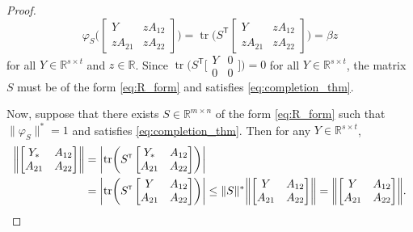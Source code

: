 \documentclass[10pt,a4paper]{amsart}
\DeclareMathOperator{\tr}{tr}
\newcommand{\R}{\mathbb{R}}
\newcommand{\tp}{{\scriptscriptstyle\mathsf{T}}}
\begin{document}
\begin{proof}
\[
\varphi_S\biggl( \begin{bmatrix}
    Y &zA_{12}\\
    zA_{21} &zA_{22}
\end{bmatrix} \biggr) =
\tr\biggl( S^\tp \begin{bmatrix}
    Y &zA_{12}\\
    zA_{21} &zA_{22}
\end{bmatrix} \biggr)=\beta z
\]
for all $Y\in \R^{s \times t}$ and $z \in \R$. Since 
$
\tr \bigl( S^\tp 
\bigl[\begin{smallmatrix}
    Y &0\\
    0 &0
\end{smallmatrix}\bigr] \bigr) = 0
$
for all $Y \in \R^{s \times t}$, the matrix $S$ must be of the form \eqref{eq:R_form} and satisfies \eqref{eq:completion_thm}.

Now, suppose that there exists $S\in \R^{m \times n}$ of the form \eqref{eq:R_form} such that $\lVert \varphi_S \rVert^*=1$ and satisfies \eqref{eq:completion_thm}. Then for any $Y\in \R^{s \times t}$,
\begin{align*}
    \biggl\lVert  \begin{bmatrix}
        Y_* & A_{12} \\
    A_{21} & A_{22}
    \end{bmatrix}  \biggr\rVert &= \biggl\lvert \tr\biggl(S^\tp  \begin{bmatrix}
        Y_* & A_{12} \\
    A_{21} & A_{22}
    \end{bmatrix} \biggr) \biggr\rvert \\
    &= \biggl\lvert \tr\biggl(S^\tp  \begin{bmatrix}
        Y & A_{12} \\
    A_{21} & A_{22}
    \end{bmatrix} \biggr) \biggr\rvert\le \lVert S\rVert^* \biggl\lVert  \begin{bmatrix}
        Y & A_{12} \\
    A_{21} & A_{22}
    \end{bmatrix}  \biggr\rVert = \biggl\lVert  \begin{bmatrix}
        Y & A_{12} \\
    A_{21} & A_{22}
    \end{bmatrix}  \biggr\rVert. \qedhere
\end{align*}
\end{proof}
\end{document}

